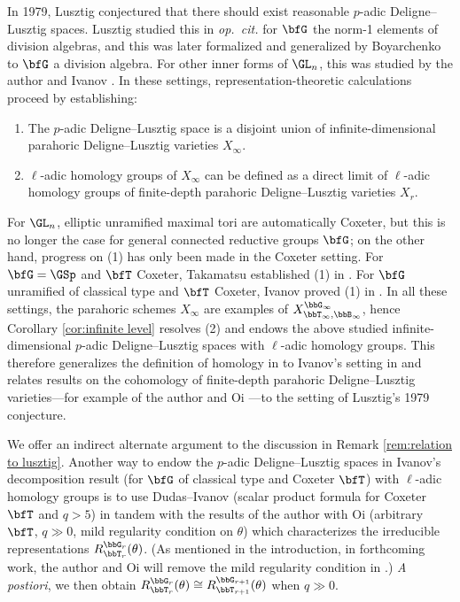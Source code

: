 \begin{remark}\label{rem:relation to lusztig}
  In 1979, Lusztig conjectured \cite{Lus79} that there should exist reasonable $p$-adic Deligne--Lusztig spaces. Lusztig studied this in \textit{op.\ cit. }for $\bfG$ the norm-1 elements of division algebras, and this was later formalized and generalized by Boyarchenko \cite{Boy12} to $\bfG$ a division algebra. For other inner forms of $\GL_n$, this was studied by the author and Ivanov \cite{CI21-MA,CI_loopGLn}. In these settings, representation-theoretic calculations proceed by establishing:
  \begin{enumerate} 
    \item The $p$-adic Deligne--Lusztig space is a disjoint union of infinite-dimensional parahoric Deligne--Lusztig varieties $X_\infty$.
    \item $\ell$-adic homology groups of $X_\infty$ can be defined as a direct limit of $\ell$-adic homology groups of finite-depth parahoric Deligne--Lusztig varieties $X_r$.
  \end{enumerate}
  For $\GL_n$, elliptic unramified maximal tori are automatically Coxeter, but this is no longer the case for general connected reductive groups $\bfG$; on the other hand, progress on (1) has only been made in the Coxeter setting. For $\bfG = \GSp$ and $\bfT$ Coxeter, Takamatsu established (1) in \cite{T23}. For $\bfG$ unramified of classical type and $\bfT$ Coxeter, Ivanov proved (1) in \cite{I23arc,I23orbit}. In all these settings, the parahoric schemes $X_\infty$ are examples of $X_{\bbT_\infty,\bbB_\infty}^{\bbG_\infty}$, hence Corollary \ref{cor:infinite level} resolves (2) and endows the above studied infinite-dimensional $p$-adic Deligne--Lusztig spaces with $\ell$-adic homology groups. This therefore generalizes the definition of homology in \cite{Lus79,Boy12,CI21-MA,CI_loopGLn} to Ivanov's setting in \cite{I23orbit} and relates results on the cohomology of finite-depth parahoric Deligne--Lusztig varieties---for example of the author and Oi \cite{CO21}---to the setting of Lusztig's 1979 conjecture.
\end{remark}

\begin{remark}\label{rem:indirect depth compat}
  We offer an indirect alternate argument to the discussion in Remark \ref{rem:relation to lusztig}. Another way to endow the $p$-adic Deligne--Lusztig spaces in Ivanov's decomposition result \cite{I23orbit} (for $\bfG$ of classical type and Coxeter $\bfT$) with $\ell$-adic homology groups is to use Dudas--Ivanov \cite{DI20} (scalar product formula for Coxeter $\bfT$ and $q>5$) in tandem with the results of the author with Oi \cite{CO21} (arbitrary $\bfT$, $q \gg 0$, mild regularity condition on $\theta$) which characterizes the irreducible representations $R_{\bbT_r}^{\bbG_r}(\theta)$. (As mentioned in the introduction, in forthcoming work, the author and Oi will remove the mild regularity condition in \cite{CO21}.) \textit{A postiori}, we then obtain $R_{\bbT_r}^{\bbG_r}(\theta) \cong R_{\bbT_{r+1}}^{\bbG_{r+1}}(\theta)$ when $q \gg 0$.
\end{remark}

